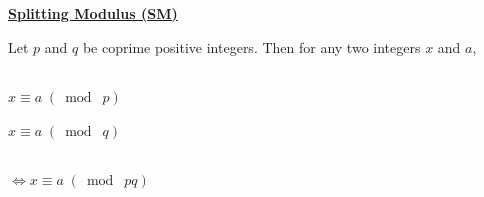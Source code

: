 \documentclass{letter}
\begin{document}
	\underline{\textbf{Splitting Modulus (SM)}}
	
	Let $p$ and $q$ be coprime positive integers. Then for any two integers $x$ and $a$,\\\\
	\begin{minipage}[t]{0.15\textwidth}
		$x \equiv a\;(\bmod\; p)$\\
		\\
		$x \equiv a\;(\bmod\; q)$
	\end{minipage}
	\begin{minipage}[t]{0.5\textwidth}
		\phantom\\
		$\iff x \equiv a\;(\bmod\; pq)$
	\end{minipage}\\
\end{document}
